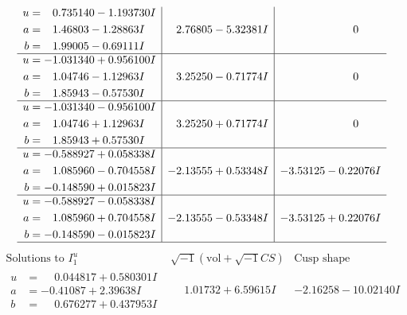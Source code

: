 \documentclass[1p]{elsarticle_modified}
\theoremstyle{definition}
\newcommand{\I}{\sqrt{-1}}
\begin{document}
$$\begin{array}{c|c|c}
\begin{aligned}
u &= \phantom{-}0.735140 - 1.193730 I \\
a &= \phantom{-}1.46803 - 1.28863 I \\
b &= \phantom{-}1.99005 - 0.69111 I\end{aligned}
 & \phantom{-}2.76805 - 5.32381 I & \phantom{-0.000000 } 0 \\ \hline\begin{aligned}
u &= -1.031340 + 0.956100 I \\
a &= \phantom{-}1.04746 - 1.12963 I \\
b &= \phantom{-}1.85943 - 0.57530 I\end{aligned}
 & \phantom{-}3.25250 - 0.71774 I & \phantom{-0.000000 } 0 \\ \hline\begin{aligned}
u &= -1.031340 - 0.956100 I \\
a &= \phantom{-}1.04746 + 1.12963 I \\
b &= \phantom{-}1.85943 + 0.57530 I\end{aligned}
 & \phantom{-}3.25250 + 0.71774 I & \phantom{-0.000000 } 0 \\ \hline\begin{aligned}
u &= -0.588927 + 0.058338 I \\
a &= \phantom{-}1.085960 - 0.704558 I \\
b &= -0.148590 + 0.015823 I\end{aligned}
 & -2.13555 + 0.53348 I & -3.53125 - 0.22076 I \\ \hline\begin{aligned}
u &= -0.588927 - 0.058338 I \\
a &= \phantom{-}1.085960 + 0.704558 I \\
b &= -0.148590 - 0.015823 I\end{aligned}
 & -2.13555 - 0.53348 I & -3.53125 + 0.22076 I\\
 \hline 
 \end{array}$$\newpage$$\begin{array}{c|c|c}  
\text{Solutions to }I^u_{1}& \I (\text{vol} + \sqrt{-1}CS) & \text{Cusp shape}\\
 \hline 
\begin{aligned}
u &= \phantom{-}0.044817 + 0.580301 I \\
a &= -0.41087 + 2.39638 I \\
b &= \phantom{-}0.676277 + 0.437953 I\end{aligned}
 & \phantom{-}1.01732 + 6.59615 I & -2.16258 - 10.02140 I \\ \hline\begin{aligned}

\end{aligned}
\end{array}$$
\end{document}
